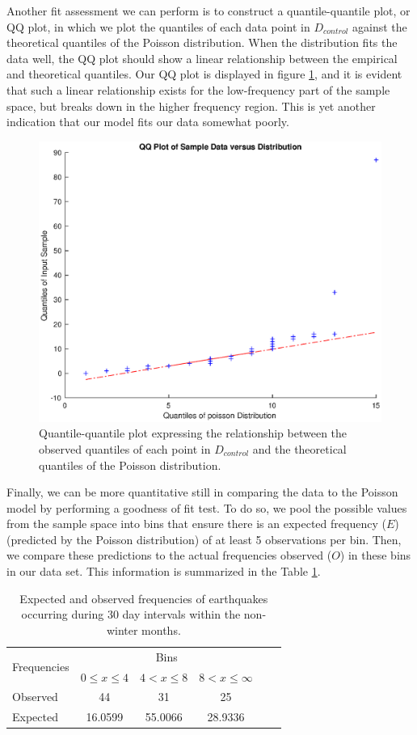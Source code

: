 \documentclass{amsart}
\begin{document}
Another fit assessment we can perform is to construct a quantile-quantile plot, or QQ plot, in which we plot the quantiles of each data point in $D_{control}$ against the theoretical quantiles of the Poisson distribution. When the distribution fits the data well, the QQ plot should show a linear relationship between the empirical and theoretical quantiles. Our QQ plot is displayed in figure \ref{F:qqplot}, and it is evident that such a linear relationship exists for the low-frequency part of the sample space, but breaks down in the higher frequency region. This is yet another indication that our model fits our data somewhat poorly.
\begin{figure}
\centering
\includegraphics[scale=0.55]{qqplotfinal}
\caption{
Quantile-quantile plot expressing the relationship between the observed quantiles of each point in $D_{control}$ and the theoretical quantiles of the Poisson distribution.\label{F:qqplot}}
\end{figure}

Finally, we can be more quantitative still in comparing the data to the Poisson model by performing a goodness of fit test.  To do so, we pool the possible values from the sample space into bins that ensure there is an expected frequency ($E$) (predicted by the Poisson distribution) of at least 5 observations per bin.  Then, we compare these predictions to the actual frequencies observed ($O$) in these bins in our data set.  This information is summarized in the Table \ref{Tbl:chi2}.

\begin{table}
{\footnotesize
\begin{tabular}{lccccc}
\toprule
\multirow{2}{*}{Frequencies} & \multicolumn{3}{c}{Bins}\\	
	& $0\le x\le 4$ &	$4<x\le 8$ & 	$8<x\le \infty $ \\
	\midrule
Observed& 44& 31& 25\\
Expected & 16.0599& 55.0066& 28.9336\\
\bottomrule
\end{tabular}}
\caption{Expected and observed frequencies of earthquakes occurring during 30 day intervals within the non-winter months.\label{Tbl:chi2}}
\end{table}
\end{document}
